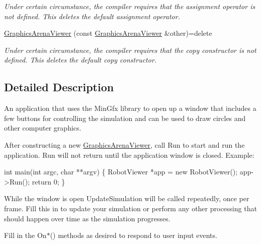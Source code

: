 \begin{DoxyCompactItemize}
\begin{DoxyCompactList}\small\item\em Under certain circumstance, the compiler requires that the assignment operator is not defined. This {\ttfamily deletes} the default assignment operator. \end{DoxyCompactList}\item 
\hyperlink{classGraphicsArenaViewer_afa70b72e0769db0f3f41fe37bc540621}{Graphics\+Arena\+Viewer} (const \hyperlink{classGraphicsArenaViewer}{Graphics\+Arena\+Viewer} \&other)=delete\hypertarget{classGraphicsArenaViewer_afa70b72e0769db0f3f41fe37bc540621}{}\label{classGraphicsArenaViewer_afa70b72e0769db0f3f41fe37bc540621}

\begin{DoxyCompactList}\small\item\em Under certain circumstance, the compiler requires that the copy constructor is not defined. This {\ttfamily deletes} the default copy constructor. \end{DoxyCompactList}\end{DoxyCompactItemize}


\subsection{Detailed Description}
An application that uses the Min\+Gfx library to open up a window that includes a few buttons for controlling the simulation and can be used to draw circles and other computer graphics. 

After constructing a new \hyperlink{classGraphicsArenaViewer}{Graphics\+Arena\+Viewer}, call Run to start and run the application. Run will not return until the application window is closed. Example\+:


\begin{DoxyCode}
\textcolor{keywordtype}{int} main(\textcolor{keywordtype}{int} argc, \textcolor{keywordtype}{char} **argv) \{
    RobotViewer *app = \textcolor{keyword}{new} RobotViewer();
    app->Run();
    \textcolor{keywordflow}{return} 0;
\}
\end{DoxyCode}


While the window is open Update\+Simulation will be called repeatedly, once per frame. Fill this in to update your simulation or perform any other processing that should happen over time as the simulation progresses.

Fill in the {\ttfamily On$\ast$()} methods as desired to respond to user input events.

